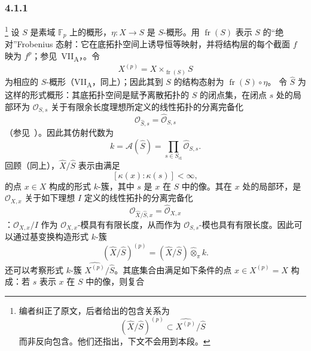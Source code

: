 
\subsubsection*{4.1.1}
\label{sga3:VIIB:4.1.1}
\footnote{\label{sga3:VIIB:nde:134}编者纠正了原文，后者给出的包含关系为
\[
  (\widehat X/\widehat S)^{(p)}
  \subset
  \widehat{X^{(p)}}/\widehat S
\]
而非反向包含。他们还指出，下文不会用到本段。}
设 \(S\) 是素域 \(\mathbb F_p\) 上的概形，\(\eta:X\to S\) 是 \(S\)-概形。用 \(\operatorname{fr}(S)\) 表示 \(S\) 的“绝对”Frobenius 态射：它在底拓扑空间上诱导恒等映射，并将结构层的每个截面 \(f\) 映为 \(f^p\)；参见\ VII\textsubscript{A}，。令
\[
  X^{(p)}=X\times_{\operatorname{fr}(S)}S
\]
为相应的 \(S\)-概形\textup{（VII\textsubscript{A}，同上）}；因此其到 \(S\) 的结构态射为 \(\operatorname{fr}(S)\circ\eta\)。
令 \(\widehat S\) 为这样的形式概形：其底拓扑空间是赋予离散拓扑的 \(S\) 的闭点集，在闭点 \(s\) 处的局部环为 \(\mathcal O_{S,s}\) 关于有限余长度理想所定义的线性拓扑的分离完备化
\[
  \mathcal O_{\widehat S,s}
  =
  \widehat{\mathcal O}_{S,s}
\]
\textup{（参见\ ）}。因此其仿射代数为
\[
  k=\mathcal A(\widehat S)
  =
  \prod_{s\in S_{\mathrm{cl}}}
  \widehat{\mathcal O}_{S,s}.
\]
回顾\textup{（同上）}，\(\widehat X/\widehat S\) 表示由满足
\[
  [\kappa(x):\kappa(s)]<\infty,
\]
的点 \(x\in X\) 构成的形式 \(k\)-簇，其中 \(s\) 是 \(x\) 在 \(S\) 中的像。其在 \(x\) 处的局部环，是 \(\mathcal O_{X,x}\) 关于如下理想 \(I\) 定义的线性拓扑的分离完备化
\[
  \mathcal O_{\widehat X/\widehat S,x}
  =
  \widehat{\mathcal O}_{X,x}
\]
：\(\mathcal O_{X,x}/I\) 作为 \(\mathcal O_{X,x}\)-模具有有限长度，从而作为 \(\mathcal O_{S,s}\)-模也具有有限长度。因此可以通过基变换构造形式 \(k\)-簇
\[
  (\widehat X/\widehat S)^{(p)}
  =
  (\widehat X/\widehat S)
  \widehat\otimes_{\pi}k.
\]
还可以考察形式 \(k\)-簇 \(\widehat{X^{(p)}}/\widehat S\)。其底集合由满足如下条件的点 \(x\in X^{(p)}=X\) 构成：若 \(s\) 表示 \(x\) 在 \(S\) 中的像，则复合
\begin{center}
  \label{sga3:VIIB:4.1.1:residue-field-frobenius-diagram}
  
\end{center}
